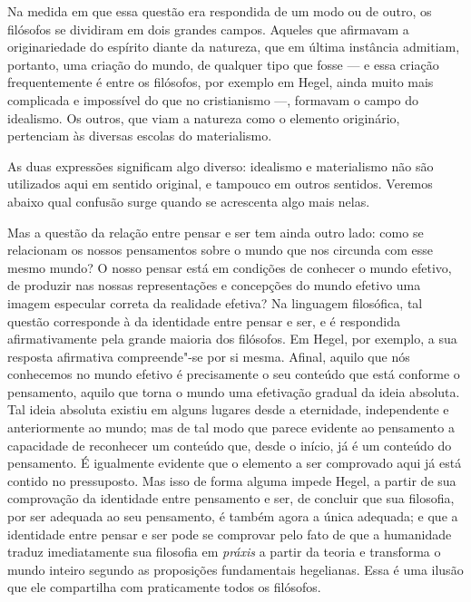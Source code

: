 Na medida em que essa questão era respondida de um modo ou de outro, os
filósofos se dividiram em dois grandes campos. Aqueles que afirmavam a
originariedade do espírito diante da natureza, que em última instância admitiam, portanto, uma criação do mundo, de qualquer tipo que fosse ---
e essa criação frequentemente é entre os filósofos, por exemplo
em Hegel,
ainda muito mais complicada e impossível do que no cristianismo ---,
formavam o campo do idealismo. Os outros, que viam a natureza como o
elemento originário, pertenciam às diversas escolas do materialismo.

As duas expressões significam algo diverso: idealismo e materialismo não
são utilizados aqui em sentido original, e tampouco em outros sentidos.
Veremos abaixo qual confusão surge quando se acrescenta algo mais nelas.

Mas a questão da relação entre pensar e ser tem ainda outro lado: como
se relacionam os nossos pensamentos sobre o mundo que nos circunda com
esse mesmo mundo? O nosso pensar está em condições de conhecer o mundo
efetivo, de produzir nas nossas representações e concepções do mundo
efetivo uma imagem especular correta da realidade 
efetiva? Na linguagem filosófica, tal questão corresponde à da
identidade entre pensar e ser, e é respondida afirmativamente pela
grande maioria dos filósofos.
Em Hegel,
por exemplo, a sua resposta afirmativa compreende"-se por si mesma. Afinal, aquilo que nós conhecemos no mundo efetivo é precisamente o seu
conteúdo que está conforme o pensamento, aquilo que torna o mundo uma
efetivação gradual da ideia absoluta. Tal ideia absoluta existiu em
alguns lugares desde a eternidade, independente e anteriormente ao
mundo; mas de tal modo que parece evidente ao pensamento a capacidade de reconhecer um conteúdo que, desde o início, já é um conteúdo do pensamento. É
igualmente evidente que o elemento a ser comprovado aqui já está contido
no pressuposto. Mas isso de forma alguma impede Hegel, a partir de sua
comprovação da identidade entre pensamento e ser, de concluir que sua
filosofia, por ser adequada ao seu pensamento, é também agora a única
adequada; e que a identidade entre pensar e ser pode se comprovar pelo %
fato de que a humanidade traduz imediatamente sua filosofia em
\emph{práxis} a partir da teoria e transforma o mundo inteiro segundo as
proposições fundamentais hegelianas. Essa é uma ilusão que ele
compartilha com praticamente todos os filósofos.

